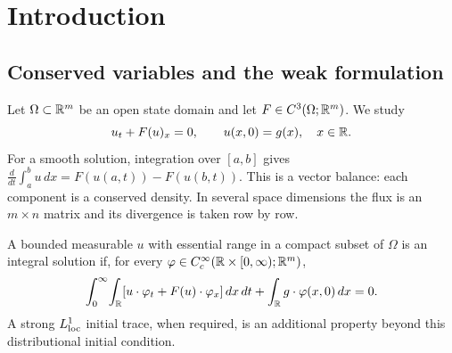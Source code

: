 \section{Introduction}
\label{sec:11-1}
\subsection{Conserved variables and the weak formulation}
Let $\Omega\subset\mathbb{R}^m$ be an open state domain and let
$F\in C^3(\Omega;\mathbb{R}^m)$. We study
\begin{equation}\label{eq:11-system}
 u_t+F(u)_x=0,\qquad u(x,0)=g(x),\quad x\in\mathbb{R}.
\end{equation}
For a smooth solution, integration over $[a,b]$ gives
$\frac d{dt}\int_a^b u\,dx=F(u(a,t))-F(u(b,t))$.
This is a vector balance: each component is a conserved density.
In several space dimensions the flux is an $m\times n$ matrix
and its divergence is taken row by row.

\begin{definition}
A bounded measurable $u$ with essential range in a compact subset of
$\Omega$ is an integral solution if, for every
$\varphi\in C_c^\infty(\mathbb{R}\times[0,\infty);\mathbb{R}^m)$,
\begin{equation}\label{eq:11-weak}
 \int_0^\infty\!\int_{\mathbb{R}}
 [u\cdot\varphi_t+F(u)\cdot\varphi_x]\,dx\,dt
 +\int_{\mathbb{R}} g\cdot\varphi(x,0)\,dx=0.
\end{equation}
A strong $L^1_{\rm loc}$ initial trace, when required, is an
additional property beyond this distributional initial condition.
\end{definition}

